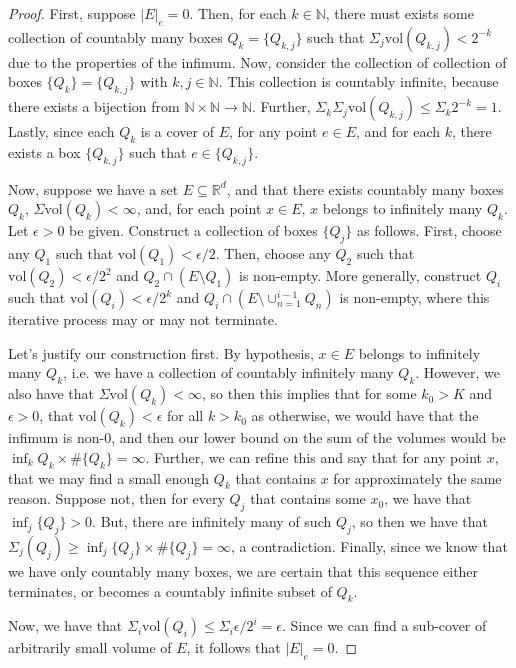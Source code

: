 \documentclass[10pt]{article}
\begin{document}
\begin{proof}[Proof]
First, suppose $|E|_e = 0$. Then, for each $k \in \mathbb{N}$, there must exists some collection of countably many boxes $Q_k = \{ Q_{k,j} \}$ such that $\Sigma_j \text{vol}(Q_{k,j}) < 2^{-k}$ due to the properties of the infimum. Now, consider the collection of collection of boxes $\{  Q_{k} \} = \{ Q_{k,j} \} $ with $k,j \in \mathbb{N}$. This collection is countably infinite, because there exists a bijection from $\mathbb{N} \times \mathbb{N} \rightarrow \mathbb{N}$. Further, $\Sigma_{k} \Sigma_{j} \text{vol}(Q_{k,j}) \leq \Sigma_k 2^{-k} = 1$. Lastly, since each $Q_k$ is a cover of $E$, for any point $e \in E$, and for each $k$, there exists a box $\{ Q_{k,j} \}$ such that $e \in \{Q_{k,j}\}$.

Now, suppose we have a set $E \subseteq \mathbb{R}^d$, and that there exists countably many boxes $Q_k$, $\Sigma \text{vol}(Q_k) < \infty$, and, for each point $x \in E$, $x$ belongs to infinitely many $Q_k$. Let $\epsilon > 0$ be given. Construct a collection of boxes $\{ Q_j \}$ as follows. First, choose any $Q_1$ such that $\text{vol}(Q_1) < \epsilon/2$. Then, choose any $Q_2$ such that $\text{vol}(Q_2) < \epsilon/2^2$ and $Q_2 \cap (E \setminus Q_1)$ is non-empty. More generally, construct $Q_i$ such that $\text{vol}(Q_i) < \epsilon/2^k$ and $Q_i \cap (E \setminus \cup_{n=1}^{i-1}Q_n)$ is non-empty, where this iterative process may or may not terminate.

Let's justify our construction first. By hypothesis, $x \in E$ belongs to infinitely many $Q_k$, i.e. we have a collection of countably infinitely many $Q_k$. However, we also have that $\Sigma \text{vol}(Q_k) < \infty$, so then this implies that for some $k_0 > K$ and $\epsilon > 0$, that $\text{vol}(Q_k) < \epsilon$ for all $k > k_0$ as otherwise, we would have that the infimum is non-0, and then our lower bound on the sum of the volumes would be $\inf_k{Q_k} \times \#\{Q_k\} = \infty$. Further, we can refine this and say that for any point $x$, that we may find a small enough $Q_k$ that contains $x$ for approximately the same reason. Suppose not, then for every $Q_j$ that contains some $x_0$, we have that $\inf_j \{Q_j\} > 0$. But, there are infinitely many of such $Q_j$, so then we have that $\Sigma_j (Q_j) \geq \inf_j\{Q_j\} \times \#\{Q_j\} = \infty$, a contradiction. Finally, since we know that we have only countably many boxes, we are certain that this sequence either terminates, or becomes a countably infinite subset of $Q_k$.

Now, we have that $\Sigma_i \text{vol}(Q_i) \leq \Sigma_i \epsilon/2^i = \epsilon$. Since we can find a sub-cover of arbitrarily small volume of $E$, it follows that $|E|_e = 0$.
\end{proof}
\end{document}
